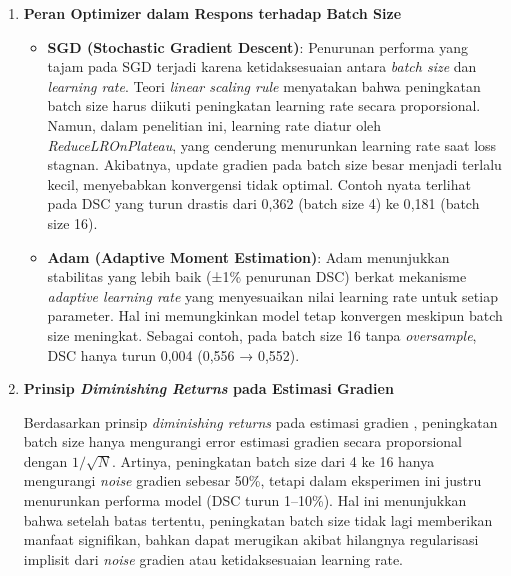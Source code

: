 \begin{enumerate}
	\item \textbf{Peran Optimizer dalam Respons terhadap Batch Size}
	\begin{itemize}
		\item \textbf{SGD (Stochastic Gradient Descent)}: Penurunan performa yang tajam pada SGD terjadi karena ketidaksesuaian antara \textit{batch size} dan \textit{learning rate}. Teori \textit{linear scaling rule} \cite{goyal_accurate_2018, panda_new_2024} menyatakan bahwa peningkatan batch size harus diikuti peningkatan learning rate secara proporsional. Namun, dalam penelitian ini, learning rate diatur oleh \textit{ReduceLROnPlateau}, yang cenderung menurunkan learning rate saat loss stagnan. Akibatnya, update gradien pada batch size besar menjadi terlalu kecil, menyebabkan konvergensi tidak optimal. Contoh nyata terlihat pada DSC yang turun drastis dari 0{,}362 (batch size 4) ke 0{,}181 (batch size 16).
		
		\item \textbf{Adam (Adaptive Moment Estimation)}: Adam menunjukkan stabilitas yang lebih baik (±1\% penurunan DSC) berkat mekanisme \textit{adaptive learning rate} yang menyesuaikan nilai learning rate untuk setiap parameter. Hal ini memungkinkan model tetap konvergen meskipun batch size meningkat. Sebagai contoh, pada batch size 16 tanpa \textit{oversample}, DSC hanya turun 0{,}004 (0{,}556 → 0{,}552).
	\end{itemize}
	
	\item \textbf{Prinsip \textit{Diminishing Returns} pada Estimasi Gradien}
	
	Berdasarkan prinsip \textit{diminishing returns} pada estimasi gradien \cite{bishop_deep_2024}, peningkatan batch size hanya mengurangi error estimasi gradien secara proporsional dengan $1/\sqrt{N}$. Artinya, peningkatan batch size dari 4 ke 16 hanya mengurangi \textit{noise} gradien sebesar 50\%, tetapi dalam eksperimen ini justru menurunkan performa model (DSC turun 1–10\%). Hal ini menunjukkan bahwa setelah batas tertentu, peningkatan batch size tidak lagi memberikan manfaat signifikan, bahkan dapat merugikan akibat hilangnya regularisasi implisit dari \textit{noise} gradien atau ketidaksesuaian learning rate.
\end{enumerate}



